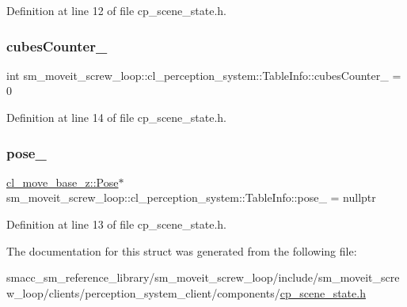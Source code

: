 Definition at line 12 of file cp\+\_\+scene\+\_\+state.\+h.

\mbox{\label{structsm__moveit__screw__loop_1_1cl__perception__system_1_1TableInfo_ae1473d306a001e77e8913f3aadb26f53}} 
\subsubsection{\texorpdfstring{cubes\+Counter\+\_\+}{cubesCounter\_}}
{\footnotesize\ttfamily int sm\+\_\+moveit\+\_\+screw\+\_\+loop\+::cl\+\_\+perception\+\_\+system\+::\+Table\+Info\+::cubes\+Counter\+\_\+ = 0}



Definition at line 14 of file cp\+\_\+scene\+\_\+state.\+h.

\mbox{\label{structsm__moveit__screw__loop_1_1cl__perception__system_1_1TableInfo_a53e37ebebdf6a01e7b542b22f947d32a}} 
\subsubsection{\texorpdfstring{pose\+\_\+}{pose\_}}
{\footnotesize\ttfamily \hyperlink{classcl__move__base__z_1_1Pose}{cl\+\_\+move\+\_\+base\+\_\+z\+::\+Pose}$\ast$ sm\+\_\+moveit\+\_\+screw\+\_\+loop\+::cl\+\_\+perception\+\_\+system\+::\+Table\+Info\+::pose\+\_\+ = nullptr}



Definition at line 13 of file cp\+\_\+scene\+\_\+state.\+h.



The documentation for this struct was generated from the following file\+:\begin{DoxyCompactItemize}
\item 
smacc\+\_\+sm\+\_\+reference\+\_\+library/sm\+\_\+moveit\+\_\+screw\+\_\+loop/include/sm\+\_\+moveit\+\_\+screw\+\_\+loop/clients/perception\+\_\+system\+\_\+client/components/\hyperlink{sm__moveit__screw__loop_2include_2sm__moveit__screw__loop_2clients_2perception__system__client_2components_2cp__scene__state_8h}{cp\+\_\+scene\+\_\+state.\+h}\end{DoxyCompactItemize}
